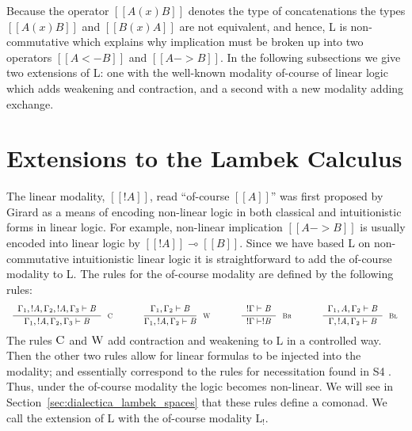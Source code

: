 \documentclass{lmcs}
\newcommand{\LB}{\text{L}_!}
\begin{document}
Because the operator $[[A (x) B]]$ denotes the type of concatenations
the types $[[A (x) B]]$ and $[[B (x) A]]$ are not equivalent, and
hence, \textsf{L} is non-commutative which explains why implication
must be broken up into two operators $[[A <- B]]$ and $[[A -> B]]$.
In the following subsections we give two extensions of L: one with the
well-known modality of-course of linear logic which adds weakening and
contraction, and a second with a new modality adding exchange.

\section{
Extensions to the Lambek Calculus}
\label{subsec:the_lambek_calculus_with_the_weakening_and_contraction_modality}

The linear modality, $[[! A]]$, read ``of-course $[[A]]$'' was first
proposed by Girard \cite{Girard:1987} as a means of encoding
non-linear logic in both classical and intuitionistic forms in linear
logic.  For example, non-linear implication $[[A -> B]]$ is usually
encoded into linear logic by $[[!A]] \multimap [[B]]$. Since we have
based L on non-commutative intuitionistic linear logic it is
straightforward to add the of-course modality to L.  The rules for the
of-course modality are defined by the following rules:
\[
\small
\begin{array}{ccccccccccc}
  \LdruleC{} & \quad & \LdruleW{} & \quad & 
  \LdruleBr{} & \quad & \LdruleBl{}
\end{array}
\]
The rules $\textsc{C}$ and $\textsc{W}$ add contraction and
weakening to L in a controlled way.  Then the other two rules allow
for linear formulas to be injected into the modality; and essentially
correspond to the rules for necessitation found in S4
\cite{bierman2000}.  Thus, under the of-course modality the logic
becomes non-linear. We will see in
Section~\ref{sec:dialectica_lambek_spaces} that these rules define a
comonad.  We call the extension of L with the of-course modality
$\LB$.
\end{document}

